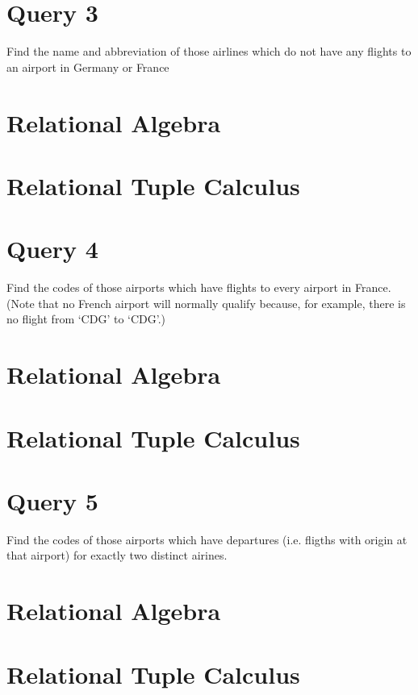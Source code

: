 \documentclass[a4paper,11pt,twoside]{article}
\begin{document}
\section{Query 3}
Find the name and abbreviation of those airlines which do not have any flights to an airport in Germany or France
 
\section{Relational Algebra}

\section{Relational Tuple Calculus}

\section{Query 4}
Find the codes of those airports which have flights to every airport in France. (Note that no French airport will normally qualify because, for example, there is no flight from `CDG' to `CDG'.)
\section{Relational Algebra}

\section{Relational Tuple Calculus}

\section{Query 5}
Find the codes of those airports which have departures (i.e. fligths with origin at that airport) for exactly two distinct airines.
\section{Relational Algebra}

\section{Relational Tuple Calculus}



\end{document}
